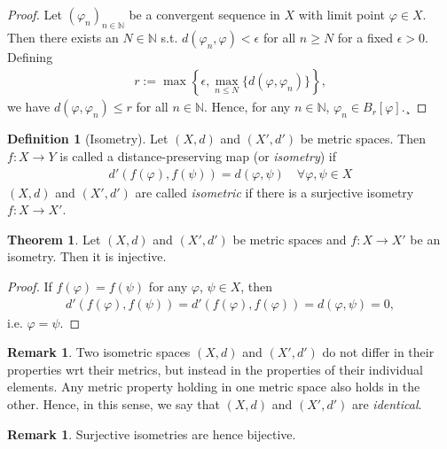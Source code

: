 \documentclass[12pt, a4paper]{article}
\numberwithin{equation}{section}
\theoremstyle{definition}
\theoremstyle{definition}
\newtheorem{defn}[thm]{Definition} %
\newtheorem{remark}[thm]{Remark} %
\newtheorem{theorem}[thm]{Theorem}
\begin{document}
	\begin{proof}
		Let $(\varphi_n)_{n\in\mathbb N}$ be a convergent sequence in $X$ with limit point $\varphi\in X$. Then there exists an $N\in\mathbb N$ s.t. $d(\varphi_n, \varphi) < \epsilon$ for all $n\geq N$ for a fixed $\epsilon > 0$. Defining
		\begin{align}
			r := \max \left\{ \epsilon, \max_{n \leq N}\{d(\varphi, \varphi_n)\} \right\},
		\end{align}
		we have $d(\varphi, \varphi_n) \leq r$ for all $n\in\mathbb N$. Hence, for any $n\in\mathbb N$, 
		$\varphi_n\in B_{r}[\varphi]$.¸
	\end{proof}
	
	\begin{defn}[Isometry]
		Let $(X, d)$ and $(X', d')$ be metric spaces. Then $f: X \rightarrow Y$ is called a distance-preserving map (or \textit{isometry}) if
		\begin{align}
			d'(f(\varphi), f(\psi)) = d(\varphi, \psi) \quad\forall \varphi, \psi\in X
		\end{align}
		$(X, d)$ and $(X', d')$ are called \textit{isometric} if there is a surjective isometry $f:X\rightarrow X'$.
	\end{defn}

	\begin{theorem}\label{thrm:isometries_injective}
		Let $(X, d)$ and $(X', d')$ be metric spaces and $f: X\rightarrow X'$  be an isometry. Then it is injective.
	\end{theorem}

	\begin{proof}
		If $f(\varphi) = f(\psi)$ for any $\varphi$, $\psi\in X$, then 
		\begin{align}
			d'(f(\varphi), f(\psi)) = d'(f(\varphi), f(\varphi)) = d(\varphi, \psi) = 0, 
		\end{align}
		i.e. $\varphi = \psi$.
	\end{proof}

	\begin{remark}
		Two isometric spaces $(X, d)$ and $(X', d')$ do not differ in their properties wrt their metrics, but instead in the properties of their individual elements. Any metric property holding in one metric space also holds in the other. Hence, in this sense, we say that $(X, d)$ and $(X', d')$ are \textit{identical}.
	\end{remark}
	
	\begin{remark}
		Surjective isometries are hence bijective.
	\end{remark}
	
\end{document}
